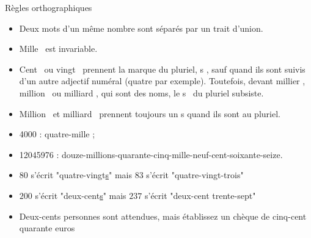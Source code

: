 \begin{prop*}{Règles orthographiques}{}
\begin{itemize}[label=$-$]
	\item Deux mots d'un même nombre sont séparés par un trait d'union.
	\item \og Mille \fg \, est invariable.
	\item \og Cent \fg \, ou \og vingt \fg \, prennent la marque du pluriel, \og s \fg, sauf quand ils sont suivis d'un autre adjectif numéral (\og quatre \fg{} par exemple). Toutefois, devant \og millier \fg, \og million \fg \, ou \og milliard \fg, qui sont des noms, le \og s \fg \, du pluriel subsiste.
	\item \og Million \fg \, et \og milliard \fg \, prennent toujours un \og s \fg{} quand ils sont au pluriel.
\end{itemize}
\end{prop*}

\begin{exemple*}{}{}
\begin{itemize}[label=$-$]
	\item \num{4000} : quatre-mille ;        
	\item \num{12045976} : douze-millions-quarante-cinq-mille-neuf-cent-soixante-seize.
	\item $80$ s'écrit "quatre-vingt\underline{s}" mais $83$ s'écrit "quatre-vingt-trois"
	\item $200$ s'écrit "deux-cent\underline{s}" mais $237$ s'écrit "deux-cent trente-sept"
	\item Deux-cents personnes sont attendues, mais établissez un chèque de cinq-cent quarante euros
\end{itemize}
\end{exemple*}